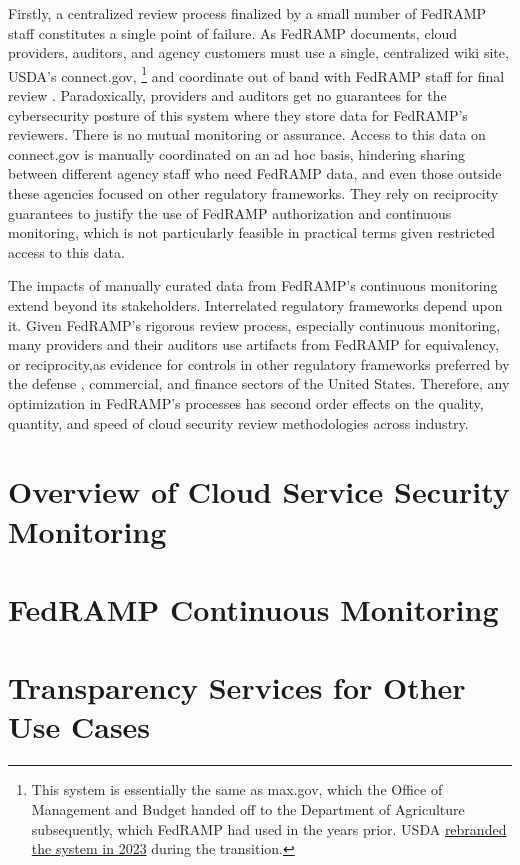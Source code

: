 \documentclass{jdf}
\begin{document}
Firstly, a centralized review process finalized by a small number of FedRAMP staff constitutes a single point of failure. As FedRAMP documents, cloud providers, auditors, and agency customers must use a single, centralized wiki site, USDA's connect.gov, \footnote{This system is essentially the same as max.gov, which the Office of Management and Budget handed off to the Department of Agriculture subsequently, which FedRAMP had used in the years prior. USDA \hyperlink{https://www.fedramp.gov/2023-11-13-usda-connect-update-to-fedramp-stakeholders/}{rebranded the system in 2023} during the transition.} and coordinate out of band with FedRAMP staff for final review \citeyear[pp.~3,14]{fedramp_auth_playbook25}. Paradoxically, providers and auditors get no guarantees for the cybersecurity posture of this system where they store data for FedRAMP's reviewers. There is no mutual monitoring or assurance. Access to this data on connect.gov is manually coordinated on an ad hoc basis, hindering sharing between different agency staff who need FedRAMP data, and even those outside these agencies focused on other regulatory frameworks. They rely on reciprocity guarantees to justify the use of FedRAMP authorization and continuous monitoring, which is not particularly feasible in practical terms given restricted access to this data.

The impacts of manually curated data from FedRAMP's continuous monitoring extend beyond its stakeholders. Interrelated regulatory frameworks depend upon it. Given FedRAMP's rigorous review process, especially continuous monitoring, many providers and their auditors use artifacts from FedRAMP for equivalency, or reciprocity,as evidence for controls in other regulatory frameworks preferred by the defense \cite{dod_fedramp_memo23}, commercial, and finance sectors of the United States. Therefore, any optimization in FedRAMP's processes has second order effects on the quality, quantity, and speed of cloud security review methodologies across industry.

\section{Overview of Cloud Service Security Monitoring}

\section{FedRAMP Continuous Monitoring}

\section{Transparency Services for Other Use Cases}
\end{document}

